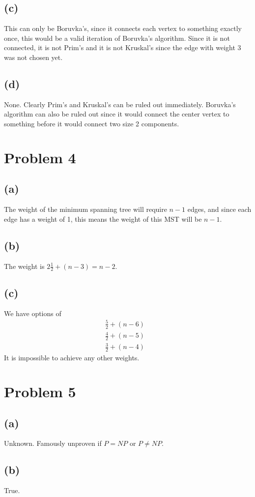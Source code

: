 \documentclass{article}
\theoremstyle{definition}
\begin{document}
\subsection*{(c)}
This can only be Boruvka's, since it connects each vertex to something exactly once, this would be a valid iteration of Boruvka's algorithm. 
Since it is not connected, it is not Prim's and it is not Kruskal's since the edge with weight 3 was not chosen yet.
\subsection*{(d)}
None. Clearly Prim's and Kruskal's can be ruled out immediately. Boruvka's algorithm can also be ruled out since it would connect the center vertex to something before it would connect two size 2 components.
\section*{Problem 4}
\subsection*{(a)}
The weight of the minimum spanning tree will require $n - 1$ edges, and since each edge has a weight of 1, this means
the weight of this MST will be $n-1$.
\subsection*{(b)}
The weight is $2 \frac{1}{2} + (n - 3) = n - 2$.
\subsection*{(c)}
We have options of
\begin{align*}
    \frac{5}{2} + (n - 6)&\\
    \frac{4}{2} + (n - 5)&\\
    \frac{3}{2} + (n - 4)
\end{align*}
It is impossible to achieve any other weights.
\section*{Problem 5}
\subsection*{(a)}
Unknown. Famously unproven if $P = NP$ or $P \neq NP$.
\subsection*{(b)}
True.
\end{document}
